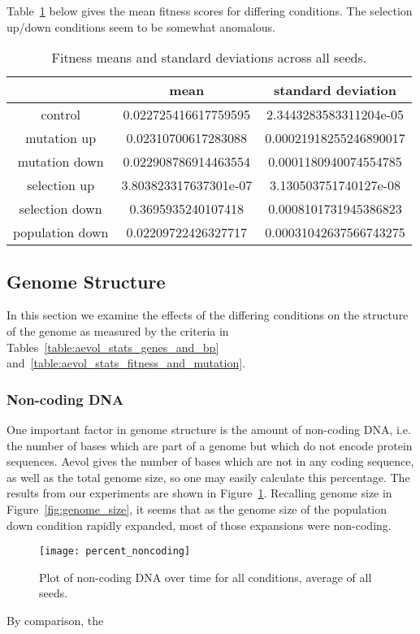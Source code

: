 Table~\ref{table:fitness_means_std_dev} below gives the mean fitness scores for differing conditions. The selection up/down conditions seem to be somewhat anomalous.
\begin{table}[H]
	\centering
	\begin{tabular}{|c||c|c|}
		\hline
		& \textbf{mean} & \textbf{standard deviation} \\
		\hline \hline
		control & 0.022725416617759595 & 2.3443283583311204e-05 \\
		\hline
		mutation up & 0.02310700617283088 & 0.00021918255246890017 \\
		\hline
		mutation down & 0.022908786914463554 & 0.0001180940074554785 \\
		\hline
		selection up & 3.803823317637301e-07 & 3.130503751740127e-08 \\
		\hline
		selection down & 0.3695935240107418	& 0.0008101731945386823 \\
		\hline
		population down & 0.02209722426327717 & 0.00031042637566743275 \\
		\hline
	\end{tabular}
	\caption[Fitness means and standard deviations.]{Fitness means and standard deviations across all seeds. }
	\label{table:fitness_means_std_dev}
\end{table}

\subsection{Genome Structure}
In this section we examine the effects of the differing conditions on the structure of the genome as measured by the criteria in Tables~\ref{table:aevol_stats_genes_and_bp} and~\ref{table:aevol_stats_fitness_and_mutation}. 

\subsubsection{Non-coding DNA}
One important factor in genome structure is the amount of non-coding DNA, i.e. the number of bases which are part of a genome but which do not encode protein sequences. Aevol gives the number of bases which are not in any coding sequence, as well as the total genome size, so one may easily calculate this percentage. The results from our experiments are shown in Figure~\ref{fig:mean_non-coding_DNA}. Recalling genome size in Figure~\ref{fig:genome_size}, it seems that as the genome size of the population down condition rapidly expanded, most of those expansions were non-coding.
\begin{figure}[H]
	\centering
	\texttt{[image: percent\_noncoding]}
	\caption[Non-coding DNA]{Plot of non-coding DNA over time for all conditions, average of all seeds.}
	\label{fig:mean_non-coding_DNA}
\end{figure}
By comparison, the 

